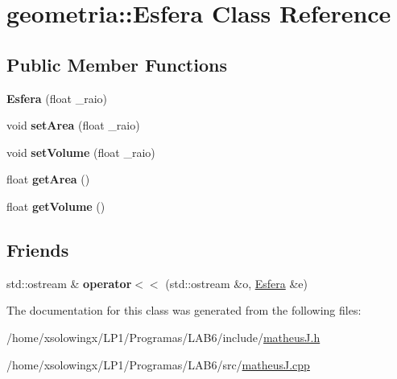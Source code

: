 \hypertarget{classgeometria_1_1Esfera}{}\section{geometria\+:\+:Esfera Class Reference}
\label{classgeometria_1_1Esfera}
\subsection*{Public Member Functions}
\begin{DoxyCompactItemize}
\item 
\mbox{\label{classgeometria_1_1Esfera_aa4914f282e4fdded15eb8c34c22d67dc}} 
{\bfseries Esfera} (float \+\_\+raio)
\item 
\mbox{\label{classgeometria_1_1Esfera_aec169aea1d1ae311ab6c9f16cdae2c4c}} 
void {\bfseries set\+Area} (float \+\_\+raio)
\item 
\mbox{\label{classgeometria_1_1Esfera_acdb27b875a27a5dedaecc2db99af79c0}} 
void {\bfseries set\+Volume} (float \+\_\+raio)
\item 
\mbox{\label{classgeometria_1_1Esfera_a59f125bd501bace6c45d5c9b121f84a2}} 
float {\bfseries get\+Area} ()
\item 
\mbox{\label{classgeometria_1_1Esfera_ad79d035b1827b172b58f8f6216415a9d}} 
float {\bfseries get\+Volume} ()
\end{DoxyCompactItemize}
\subsection*{Friends}
\begin{DoxyCompactItemize}
\item 
\mbox{\label{classgeometria_1_1Esfera_a1b53c47da8e291938fc8d166965a92f7}} 
std\+::ostream \& {\bfseries operator$<$$<$} (std\+::ostream \&o, \hyperlink{classgeometria_1_1Esfera}{Esfera} \&e)
\end{DoxyCompactItemize}


The documentation for this class was generated from the following files\+:\begin{DoxyCompactItemize}
\item 
/home/xsolowingx/\+L\+P1/\+Programas/\+L\+A\+B6/include/\hyperlink{matheusJ_8h}{matheus\+J.\+h}\item 
/home/xsolowingx/\+L\+P1/\+Programas/\+L\+A\+B6/src/\hyperlink{matheusJ_8cpp}{matheus\+J.\+cpp}\end{DoxyCompactItemize}

